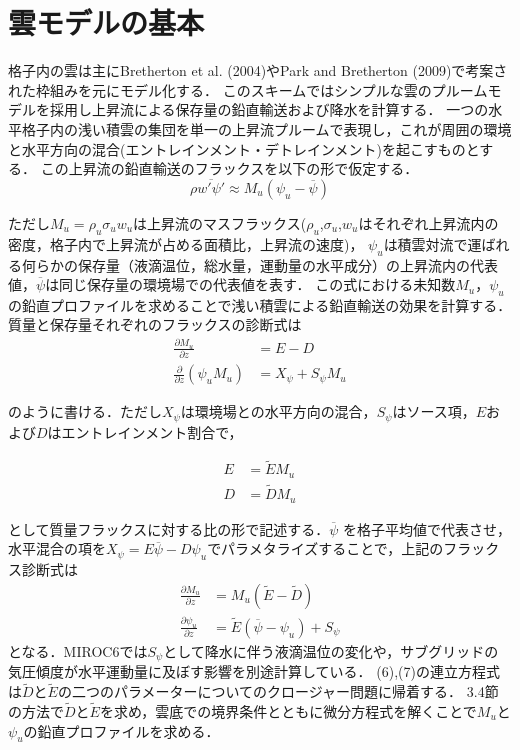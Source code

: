 \documentclass[platex, dvipdfmx]{jsarticle}
\begin{document}
\section{雲モデルの基本}

格子内の雲は主にBretherton et al. (2004)やPark and Bretherton (2009)で考案された枠組みを元にモデル化する．
このスキームではシンプルな雲のプルームモデルを採用し上昇流による保存量の鉛直輸送および降水を計算する．
一つの水平格子内の浅い積雲の集団を単一の上昇流プルームで表現し，これが周囲の環境と水平方向の混合(エントレインメント・デトレインメント)を起こすものとする．
この上昇流の鉛直輸送のフラックスを以下の形で仮定する．
\begin{equation}
    \rho \overline {w' \psi '}\approx M_u (\psi_u-\overline{\psi}) 
\end{equation}

ただし$M_u=\rho_u\sigma_u w_u$は上昇流のマスフラックス($\rho_u$,$\sigma_u$,$w_u$はそれぞれ上昇流内の密度，格子内で上昇流が占める面積比，上昇流の速度)，
$\psi_u$は積雲対流で運ばれる何らかの保存量（液滴温位，総水量，運動量の水平成分）の上昇流内の代表値，$\overline{\psi}$は同じ保存量の環境場での代表値を表す．
この式における未知数$M_u$，$\psi_u$の鉛直プロファイルを求めることで浅い積雲による鉛直輸送の効果を計算する．
質量と保存量それぞれのフラックスの診断式は
\begin{align}
    \frac{\partial M_u}{\partial z} &= E - D \\
    \frac{\partial}{\partial z} (\psi_u M_u) &= X_\psi + S_\psi M_u
\end{align}

のように書ける．ただし$X_\psi$は環境場との水平方向の混合，$S_\psi$はソース項，$E$および$D$はエントレインメント割合で，

\begin{align}
    E &=\tilde{E}M_u \\
    D &=\tilde{D} M_u
\end{align}

として質量フラックスに対する比の形で記述する．$\overline{\psi}$ を格子平均値で代表させ，
水平混合の項を$X_{\psi}=E \overline{\psi} - D\psi_u$でパラメタライズすることで，上記のフラックス診断式は
\begin{align}
    \frac{\partial M_u}{\partial z} &= M_u (\tilde{E} - \tilde{D}) \\
    \frac{\partial \psi_u}{\partial z} &= \tilde{E}(\overline{\psi} - \psi_u) + S_{\psi}
\end{align}
となる．MIROC6では$S_{\psi}$として降水に伴う液滴温位の変化や，サブグリッドの気圧傾度が水平運動量に及ぼす影響を別途計算している．
(6),(7)の連立方程式は$\tilde{D}$と$\tilde{E}$の二つのパラメーターについてのクロージャー問題に帰着する．
3.4節の方法で$\tilde{D}$と$\tilde{E}$を求め，雲底での境界条件とともに微分方程式を解くことで$M_u$と$\psi_u$の鉛直プロファイルを求める．
\end{document}
